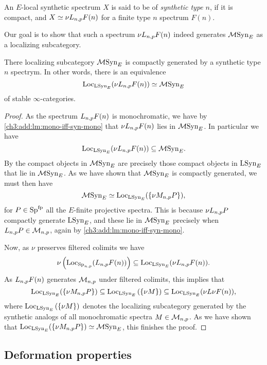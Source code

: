 \begin{definition}
    An $E$-local synthetic spectrum $X$ is said to be of \emph{synthetic type} $n$, if it is compact, and $X\simeq \nu L_{n,p} F(n)$ for a finite type $n$ spectrum $F(n)$. 
\end{definition}

Our goal is to show that such a spectrum $\nu L_{n,p} F(n)$ indeed generates $\mathcal{M}\mathrm{Syn}_{E}$ as a localizing subcategory. 

\begin{lemma}
    \label{ch3:add:monochromatic-synthetic-is-gen-by-type-n}
    There localizing subcategory $\mathcal{M}\mathrm{Syn}_{E}$ is compactly generated by a synthetic type $n$ spectrym. In other words, there is an equivalence 
    \[\operatorname{Loc}_{\mathrm{LSyn}_{E}}(\nu L_{n,p} F(n))\simeq \mathcal{M}\mathrm{Syn}_{E}\]
    of stable $\infty$-categories. 
\end{lemma}
\begin{proof}
    As the spectrum $L_{n,p} F(n)$ is monochromatic, we have by \cref{ch3:add:lm:mono-iff-syn-mono} that $\nu L_{n,p} F(n)$ lies in $\mathcal{M}\mathrm{Syn}_{E}$. In particular we have 
    \[\operatorname{Loc}_{\mathrm{LSyn}_{E}}(\nu L_{n,p} F(n))\subseteq \mathcal{M}\mathrm{Syn}_{E}.\]
    By \cite[2.2]{neeman_1992} the compact objects in $\mathcal{M}\mathrm{Syn}_{E}$ are precisely those compact objects in $\mathrm{LSyn}_{E}$ that lie in $\mathcal{M}\mathrm{Syn}_{E}$. As we have shown that $\mathcal{M}\mathrm{Syn}_{E}$ is compactly generated, we must then have 
    \[\mathcal{M}\mathrm{Syn}_{E} \simeq \operatorname{Loc}_{\mathrm{LSyn}_{E}}(\{\nu M_{n,p} P\}),\]
    for $P \in \mathrm{Sp}^{\mathrm{fp}}$ all the $E$-finite projective spectra. This is because $\nu L_{n,p} P$ compactly generate $\mathrm{LSyn}_{E}$, and these lie in $\mathcal{M}\mathrm{Syn}_{E}$ precisely when $L_{n,p} P\in \mathcal{M}_{n,p}$, again by \cref{ch3:add:lm:mono-iff-syn-mono}. 

    Now, as $\nu$ preserves filtered colimits we have 
    \[\nu \left(\operatorname{Loc}_{\mathrm{Sp}_{n,p}}(L_{n,p} F(n))\right)\subseteq \operatorname{Loc}_{\mathrm{LSyn}_{E}}(\nu L_{n,p} F(n)).\]
    As $L_{n,p} F(n)$ generates $\mathcal{M}_{n,p}$ under filtered colimits, this implies that 
    \[\operatorname{Loc}_{\mathrm{LSyn}_{E}}(\{\nu M_{n,p} P\})\subseteq \operatorname{Loc}_{\mathrm{LSyn}_{E}}\left(\{\nu M\}\right) \subseteq \operatorname{Loc}_{\mathrm{LSyn}_{E}}(\nu L\nu F(n)),\]
    where $\operatorname{Loc}_{\mathrm{LSyn}_{E}}\left(\{\nu M\}\right)$ denotes the localizing subcategory generated by the synthetic analogs of all monochromatic spectra $M\in \mathcal{M}_{n,p}$. As we have shown that $\operatorname{Loc}_{\mathrm{LSyn}_{E}}(\{\nu M_{n,p} P\})\simeq \mathcal{M}\mathrm{Syn}_{E}$, this finishes the proof. 
\end{proof}



\subsection{Deformation properties}

